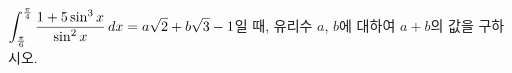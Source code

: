 $\displaystyle\int_{\frac{\pi}{6}}^{\frac{\pi}{4}}\dfrac{1+5\sin^3 x}{\sin^2 x}\mkern3mu dx=a\sqrt{2}+b\sqrt{3}-1$일 때, 유리수 $a$, $b$에 대하여 $a+b$의 값을 구하시오.
